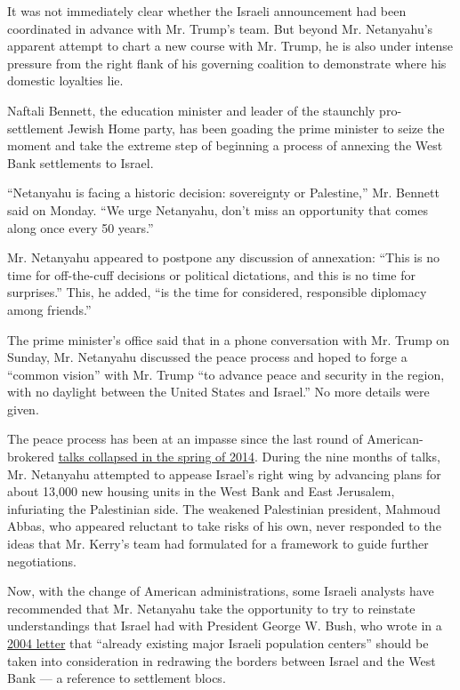 It was not immediately clear whether the Israeli announcement had been
coordinated in advance with Mr. Trump's team. But beyond Mr. Netanyahu's
apparent attempt to chart a new course with Mr. Trump, he is also under
intense pressure from the right flank of his governing coalition to
demonstrate where his domestic loyalties lie.

Naftali Bennett, the education minister and leader of the staunchly
pro-settlement Jewish Home party, has been goading the prime minister to
seize the moment and take the extreme step of beginning a process of
annexing the West Bank settlements to Israel.

``Netanyahu is facing a historic decision: sovereignty or Palestine,''
Mr. Bennett said on Monday. ``We urge Netanyahu, don't miss an
opportunity that comes along once every 50 years.''

Mr. Netanyahu appeared to postpone any discussion of annexation: ``This
is no time for off-the-cuff decisions or political dictations, and this
is no time for surprises.'' This, he added, ``is the time for
considered, responsible diplomacy among friends.''

The prime minister's office said that in a phone conversation with Mr.
Trump on Sunday, Mr. Netanyahu discussed the peace process and hoped to
forge a ``common vision'' with Mr. Trump ``to advance peace and security
in the region, with no daylight between the United States and Israel.''
No more details were given.

The peace process has been at an impasse since the last round of
American-brokered
\href{https://www.nytimes3xbfgragh.onion/2014/04/29/world/middleeast/arc-of-a-failed-deal-how-nine-months-of-mideast-talks-ended-in-dissarray.html}{talks
collapsed in the spring of 2014}. During the nine months of talks, Mr.
Netanyahu attempted to appease Israel's right wing by advancing plans
for about 13,000 new housing units in the West Bank and East Jerusalem,
infuriating the Palestinian side. The weakened Palestinian president,
Mahmoud Abbas, who appeared reluctant to take risks of his own, never
responded to the ideas that Mr. Kerry's team had formulated for a
framework to guide further negotiations.

Now, with the change of American administrations, some Israeli analysts
have recommended that Mr. Netanyahu take the opportunity to try to
reinstate understandings that Israel had with President George W. Bush,
who wrote in a
\href{https://georgewbush-whitehouse.archives.gov/news/releases/2004/04/20040414-3.html}{2004
letter} that ``already existing major Israeli population centers''
should be taken into consideration in redrawing the borders between
Israel and the West Bank --- a reference to settlement blocs.

